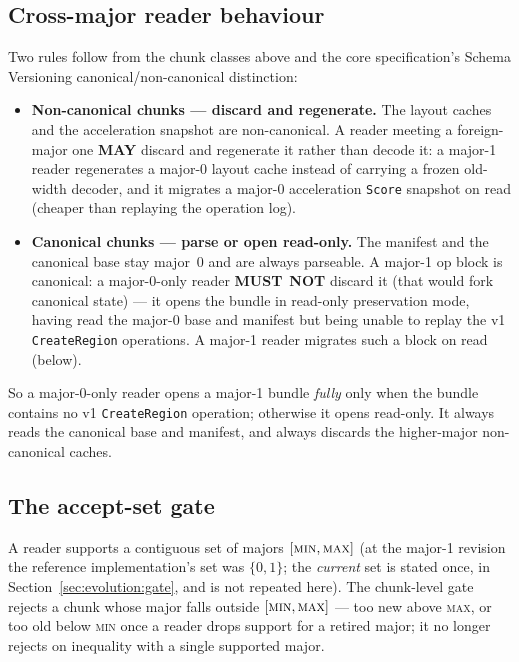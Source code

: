 \documentclass[11pt,letterpaper]{report}
\newcommand{\sectionsc}[1]{{\addfontfeatures{Letters=SmallCaps}#1}}
\newcommand{\MUSTNOT}{\textbf{MUST}\nobreak\ \textbf{NOT}}
\newcommand{\MAY}{\textbf{MAY}}
\begin{document}
\subsection{Cross-major reader behaviour}
Two rules follow from the chunk classes above and the core specification's
\sectionsc{Schema Versioning} canonical/non-canonical distinction:

\begin{itemize}
  \item \textbf{Non-canonical chunks --- discard and regenerate.} The layout
    caches and the acceleration snapshot are non-canonical. A reader meeting a
    foreign-major one \MAY{} discard and regenerate it rather than decode it: a
    major-1 reader regenerates a major-0 layout cache instead of carrying a
    frozen old-width decoder, and it migrates a major-0 acceleration
    \texttt{Score} snapshot on read (cheaper than replaying the operation log).
  \item \textbf{Canonical chunks --- parse or open read-only.} The manifest and
    the canonical base stay major~0 and are always parseable. A major-1 op
    block is canonical: a major-0-only reader \MUSTNOT{} discard it (that would
    fork canonical state) --- it opens the bundle in read-only preservation
    mode, having read the major-0 base and manifest but being unable to replay
    the v1 \texttt{CreateRegion} operations. A major-1 reader migrates such a
    block on read (below).
\end{itemize}

So a major-0-only reader opens a major-1 bundle \emph{fully} only when the
bundle contains no v1 \texttt{CreateRegion} operation; otherwise it opens
read-only. It always reads the canonical base and manifest, and always
discards the higher-major non-canonical caches.

\subsection{The accept-set gate}
A reader supports a contiguous set of majors $[\textsc{min}, \textsc{max}]$
(at the major-1 revision the reference implementation's set was $\{0, 1\}$;
the \emph{current} set is stated once, in
Section~\ref{sec:evolution:gate}, and is not repeated here). The
chunk-level gate rejects a chunk whose major falls outside
$[\textsc{min}, \textsc{max}]$ --- too new above \textsc{max}, or too old
below \textsc{min} once a reader drops support for a retired major; it no
longer rejects on inequality with a single supported major.
\end{document}
